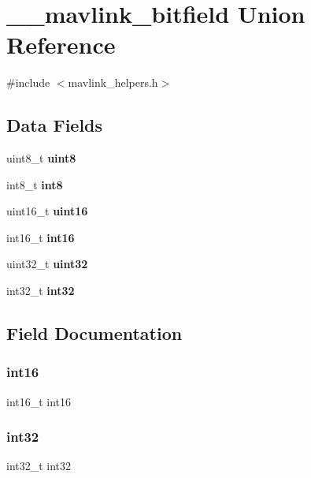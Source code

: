 \section{\+\_\+\+\_\+mavlink\+\_\+bitfield Union Reference}
\label{union____mavlink__bitfield}


{\ttfamily \#include $<$mavlink\+\_\+helpers.\+h$>$}

\subsection*{Data Fields}
\begin{DoxyCompactItemize}
\item 
uint8\+\_\+t \textbf{ uint8}
\item 
int8\+\_\+t \textbf{ int8}
\item 
uint16\+\_\+t \textbf{ uint16}
\item 
int16\+\_\+t \textbf{ int16}
\item 
uint32\+\_\+t \textbf{ uint32}
\item 
int32\+\_\+t \textbf{ int32}
\end{DoxyCompactItemize}


\subsection{Field Documentation}
\mbox{\label{union____mavlink__bitfield_a7cd86ccaa2b7be3ef15423f3f58e929e}} 
\subsubsection{int16}
{\footnotesize\ttfamily int16\+\_\+t int16}

\mbox{\label{union____mavlink__bitfield_a4f658422e832e5e2d56e2245cb84be84}} 
\subsubsection{int32}
{\footnotesize\ttfamily int32\+\_\+t int32}

\mbox{\label{union____mavlink__bitfield_ae0a430ab8199def132f3f07af5c84066}} 

